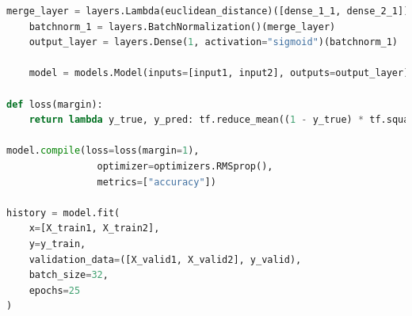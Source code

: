 \begin{lstlisting}[language=Python]
    merge_layer = layers.Lambda(euclidean_distance)([dense_1_1, dense_2_1])
    batchnorm_1 = layers.BatchNormalization()(merge_layer)
    output_layer = layers.Dense(1, activation="sigmoid")(batchnorm_1)
    
    model = models.Model(inputs=[input1, input2], outputs=output_layer)

def loss(margin):
    return lambda y_true, y_pred: tf.reduce_mean((1 - y_true) * tf.square(y_pred) + y_true * tf.square(tf.maximum(margin - y_pred, 0)))

model.compile(loss=loss(margin=1),
                optimizer=optimizers.RMSprop(),
                metrics=["accuracy"])

history = model.fit(
    x=[X_train1, X_train2],
    y=y_train,
    validation_data=([X_valid1, X_valid2], y_valid),
    batch_size=32,
    epochs=25
)
\end{lstlisting}

\newpage